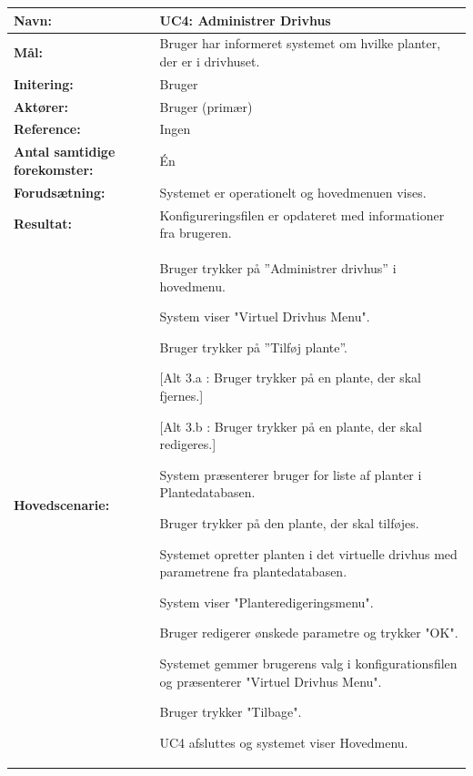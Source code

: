 \begin{table}[h]
\begin{tabularx}{\textwidth}{| >{\raggedright\arraybackslash}p{3.3 cm} | >{\raggedright\arraybackslash}X |} \hline

\textbf{Navn:} 						& UC4: Administrer Drivhus\\ \hline
\textbf{Mål:}						& Bruger har informeret systemet om hvilke planter, der er i drivhuset. \\ \hline
\textbf{Initering:}					& Bruger \\ \hline
\textbf{Aktører:} 					& Bruger (primær) \\ \hline
\textbf{Reference:} 					& Ingen \\ \hline
\textbf{Antal samtidige forekomster:} & Én \\ \hline
\textbf{Forudsætning:} 				& Systemet er operationelt og hovedmenuen vises.\\ \hline
\textbf{Resultat:}					& Konfigureringsfilen er opdateret med informationer fra brugeren. \\ \hline
\textbf{Hovedscenarie:}				& 

\begin{packed_enum}
\item Bruger trykker på ”Administrer drivhus” i hovedmenu.
\item System viser "Virtuel Drivhus Menu". 
\item Bruger trykker på ”Tilføj plante”.
	\begin{packed_item}\itemsep1pt \parskip0pt \parsep0pt
	\item {[}Alt 3.a : Bruger trykker på en plante, der skal fjernes.{]}
	\end{packed_item}
	\begin{packed_item}\itemsep1pt \parskip0pt \parsep0pt
	\item {[}Alt 3.b : Bruger trykker på en plante, der skal redigeres.{]}
	\end{packed_item}
\item System præsenterer bruger for liste af planter i Plantedatabasen.
\item Bruger trykker på den plante, der skal tilføjes.
\item Systemet opretter planten i det virtuelle drivhus med parametrene fra plantedatabasen.
\item System viser "Planteredigeringsmenu".
\item Bruger redigerer ønskede parametre og trykker "OK".
\item Systemet gemmer brugerens valg i konfigurationsfilen og præsenterer "Virtuel Drivhus Menu".
\item Bruger trykker "Tilbage".
\item UC4 afsluttes og systemet viser Hovedmenu.
\end{packed_enum} \\ \hline


\end{tabularx}
\end{table}

